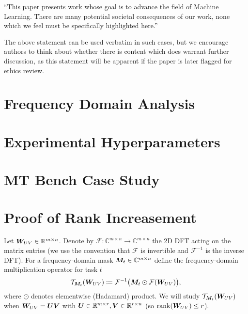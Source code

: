 \documentclass{article}
\theoremstyle{plain}
\theoremstyle{definition}
\theoremstyle{remark}
\begin{document}
``This paper presents work whose goal is to advance the field of 
Machine Learning. There are many potential societal consequences 
of our work, none which we feel must be specifically highlighted here.''

The above statement can be used verbatim in such cases, but we 
encourage authors to think about whether there is content which does 
warrant further discussion, as this statement will be apparent if the 
paper is later flagged for ethics review.


\nocite{langley00}





\newpage
\appendix
\onecolumn

\section{Frequency Domain Analysis}

\section{Experimental Hyperparameters}

\section{MT Bench Case Study}

\section{Proof of Rank Increasement}
Let ${\bm{W}}_{UV}\in\mathbb{R}^{m\times n}$. Denote by $\mathcal{F}:\mathbb{C}^{m\times n}\to\mathbb{C}^{m\times n}$ the 2D DFT acting on the matrix entries (we use the convention that $\mathcal{F}$ is invertible and $\mathcal{F}^{-1}$ is the inverse DFT). For a frequency-domain mask ${\bm{M}}_t\in\mathbb{C}^{m\times n}$ define the frequency-domain multiplication operator for task $t$
\begin{align}
\mathcal{T}_{{\bm{M}}_t}({\bm{W}}_{UV}) \coloneqq \mathcal{F}^{-1}\big({\bm{M}}_t \odot \mathcal{F}({\bm{W}}_{UV})\big),
\end{align}
where $\odot$ denotes elementwise (Hadamard) product. We will study $\mathcal{T}_{{\bm{M}}_t}({\bm{W}}_{UV})$ when ${\bm{W}}_{UV}={\bm{U}}{\bm{V}}$ with ${\bm{U}}\in\mathbb{R}^{m\times r}, {\bm{V}}\in\mathbb{R}^{r\times n}$ (so $\operatorname{rank}({\bm{W}}_{UV})\le r$).
\end{document}
